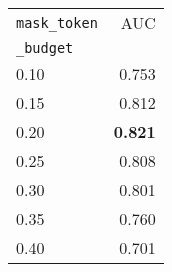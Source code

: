 
\begin{table}[!htb]
\footnotesize
    \begin{subtable}{.33\linewidth}
      \centering
        \begin{tabular}{@{}lr@{}}
        \toprule
        \texttt{mask\_token} & AUC \\
        \texttt{\_budget} &  \\ \midrule
        0.10                  &  0.753      \\
        0.15                  &  0.812      \\
        0.20                  &  \textbf{0.821}      \\
        0.25                  &  0.808      \\
        0.30                  &  0.801      \\
        0.35                  &  0.760      \\
        0.40                  &  0.701      \\ \bottomrule
        \end{tabular}
        \caption{}
        \label{table:ablation_mask_token}
    \end{subtable}%
    \begin{subtable}{.33\linewidth}
      \centering
        

\end{subtable}
\end{table}
